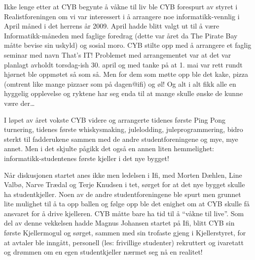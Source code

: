 Ikke lenge etter at CYB begynte å våkne til liv ble CYB forespurt av styret i Realistforeningen om vi var interessert i å arrangere noe informatikk-vennlig i April måned i det herrens år 2009. April hadde blitt valgt ut til å være Informatikk-måneden med faglige foredrag (dette var året da The Pirate Bay måtte bevise sin uskyld) og sosial moro. CYB stilte opp med å arrangere et faglig seminar med navn That’s IT! Problemet med arrangementet var at det var planlagt avholdt torsdag-ish 30. april og med tanke på at 1. mai var rett rundt hjørnet ble oppmøtet så som så. Men for dem som møtte opp ble det kake, pizza (omtrent like mange pizzaer som på dagen@ifi) og øl! Og alt i alt fikk alle en hyggelig opplevelse og ryktene har seg enda til at mange skulle ønske de kunne være der…

I løpet av året vokste CYB videre og arrangerte tidenes første Ping Pong turnering, tidenes første whiskysmaking, julelodding, juleprogrammering, bidro sterkt til fadderukene sammen med de andre studentforeningene og mye, mye annet. Men i det skjulte pågikk det også en annen liten hemmelighet: informatikk-studentenes første kjeller i det nye bygget!

Når diskusjonen startet anes ikke men ledelsen i Ifi, med Morten Dæhlen, Line Valbø, Narve Trædal og Terje Knudsen i tet, sørget for at det nye bygget skulle ha studentkjeller. Noen av de andre studentforeningene ble spurt men grunnet lite mulighet til å ta opp ballen og følge opp ble det enighet om at CYB skulle få ansvaret for å drive kjelleren. CYB måtte bare ha tid til å ``våkne til live''. Som del av denne vekkelsen hadde Magnus Johansen startet på Ifi, blitt CYB sin første Kjellermogul og sørget, sammen med sin trofaste gjeng i Kjellerstyret, for at avtaler ble inngått, personell (les: frivillige studenter) rekruttert og ivaretatt og drømmen om en egen studentkjeller nærmet seg nå en realitet!

